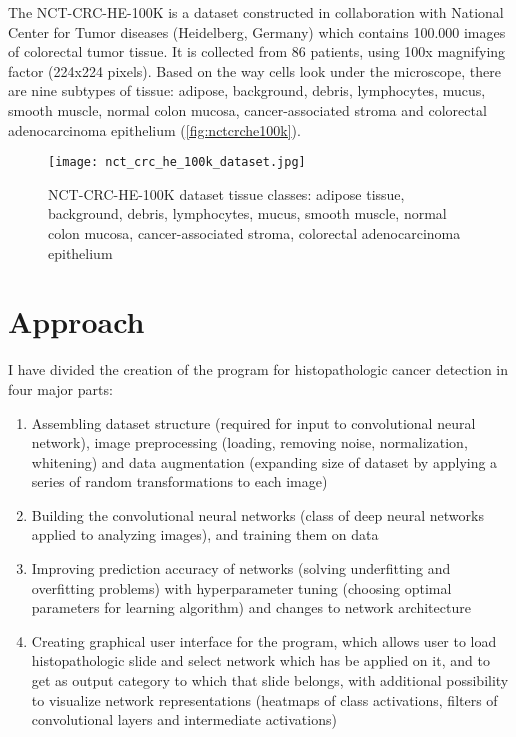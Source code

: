 The NCT-CRC-HE-100K is a dataset constructed in collaboration with National Center for Tumor diseases (Heidelberg, Germany) which contains 100.000 images of colorectal tumor tissue. It is collected from 86 patients, using 100x magnifying factor (224x224 pixels). Based on the way cells look under the microscope, there are nine subtypes of tissue: adipose, background, debris, lymphocytes, mucus, smooth muscle, normal colon mucosa, cancer-associated stroma and colorectal adenocarcinoma epithelium (\textcolor{red}{\autoref{fig:nctcrche100k}}).

\begin{figure}[h]
	\centering
	\texttt{[image: nct\_crc\_he\_100k\_dataset.jpg]}
	\caption{NCT-CRC-HE-100K dataset tissue classes: adipose tissue, background, debris, lymphocytes, mucus, smooth muscle, normal colon mucosa, cancer-associated stroma, colorectal adenocarcinoma epithelium}
	\label{fig:nctcrche100k}
\end{figure}

\section{Approach}

I have divided the creation of the program for histopathologic cancer detection in four major parts:
\begin{enumerate}
	\itemsep0em
	\item Assembling dataset structure (required for input to convolutional neural network), image preprocessing (loading, removing noise, normalization, whitening) and data augmentation (expanding size of dataset by applying a series of random transformations to each image)
	\item Building the convolutional neural networks (class of deep neural networks applied to analyzing images), and training them on data
	\item Improving prediction accuracy of networks (solving underfitting and overfitting problems) with hyperparameter tuning (choosing optimal parameters for learning algorithm) and changes to network architecture
	\item Creating graphical user interface for the program, which allows user to load histopathologic slide and select network which has be applied on it, and to get as output category to which that slide belongs, with additional possibility to visualize network representations (heatmaps of class activations, filters of convolutional layers and intermediate activations)
\end{enumerate}
